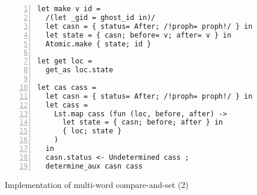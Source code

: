 \begin{figure}[tp]
\begin{lstlisting}[numbers=left]
let make v id =
  /(let _gid = ghost_id in)/
  let casn = { status= After; /!proph= proph!/ } in
  let state = { casn; before= v; after= v } in
  Atomic.make { state; id }

let get loc =
  get_as loc.state

let cas cass =
  let casn = { status= After; /!proph= proph!/ } in
  let cass =
    Lst.map cass (fun (loc, before, after) ->
      let state = { casn; before; after } in
      { loc; state }
    )
  in
  casn.status <- Undetermined cass ;
  determine_aux casn cass
\end{lstlisting}
\caption{Implementation of multi-word compare-and-set (2)}
\label{fig:mcas}
\end{figure}